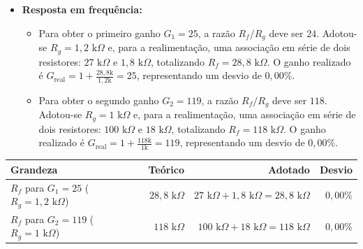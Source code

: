 \documentclass[11pt,a4paper]{article}
\begin{document}
\begin{itemize}

    \item \textbf{Resposta em frequência:}
    \begin{itemize}

        \item Para obter o primeiro ganho $G_1=25$, a razão $R_f/R_g$ deve ser $24$. Adotou-se $R_g=1{,}2\text{ k}\Omega$ e, para a realimentação, uma associação em série de dois resistores: $27\text{ k}\Omega$ e $1{,}8\text{ k}\Omega$, totalizando $R_f=28{,}8\text{ k}\Omega$. O ganho realizado é $G_{\text{real}}=1+\frac{28{,}8\text{k}}{1{,}2\text{k}}=25$, representando um desvio de $0{,}00\%$.

        \item Para obter o segundo ganho $G_2=119$, a razão $R_f/R_g$ deve ser $118$. Adotou-se $R_g=1\text{ k}\Omega$ e, para a realimentação, uma associação em série de dois resistores: $100\text{ k}\Omega$ e $18\text{ k}\Omega$, totalizando $R_f=118\text{ k}\Omega$. O ganho realizado é $G_{\text{real}}=1+\frac{118\text{k}}{1\text{k}}=119$, representando um desvio de $0{,}00\%$.

    \end{itemize}
\end{itemize}

\begin{center}
\renewcommand{\arraystretch}{1.2}
\begin{tabular}{@{}lrrr@{}}
\toprule
\textbf{Grandeza} & \textbf{Teórico} & \textbf{Adotado} & \textbf{Desvio} \\
\midrule
$R_f$ para $G_1=25$ ($R_g=1{,}2\text{ k}\Omega$) & $28{,}8\text{ k}\Omega$ & $27\text{ k}\Omega+1{,}8\text{ k}\Omega=28{,}8\text{ k}\Omega$ & $0{,}00\%$ \\
$R_f$ para $G_2=119$ ($R_g=1\text{ k}\Omega$) & $118\text{ k}\Omega$ & $100\text{ k}\Omega+18\text{ k}\Omega=118\text{ k}\Omega$ & $0{,}00\%$ \\
\bottomrule
\end{tabular}
\end{center}
\end{document}
